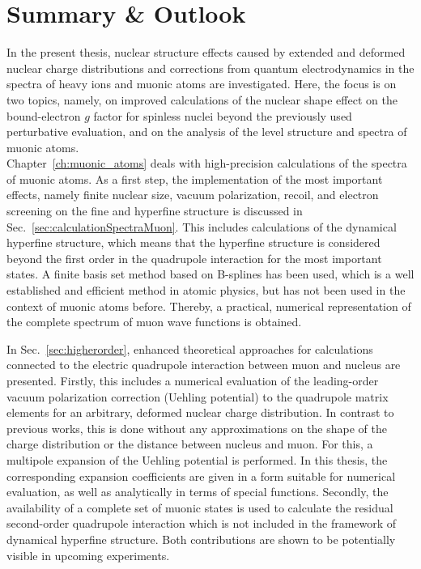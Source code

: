 \chapter*{Summary \& Outlook}
\label{ch:conclusion}

In the present thesis, nuclear structure effects caused by extended and deformed nuclear charge distributions and corrections from quantum electrodynamics in the spectra of heavy ions and muonic atoms are investigated. 
Here, the focus is on two topics, namely, on improved calculations of the nuclear shape effect on the bound-electron $g$ factor for spinless nuclei beyond the previously used perturbative evaluation, and on the analysis of the level structure and spectra of muonic atoms.\\[11pt]%
%
Chapter~\ref{ch:muonic_atoms} deals with high-precision calculations of the spectra of muonic atoms. 
As a first step, the implementation of the most important effects, namely finite nuclear size, vacuum polarization, recoil, and electron screening on the fine and hyperfine structure is discussed in Sec.~\ref{sec:calculationSpectraMuon}.
This includes calculations of the dynamical hyperfine structure, which means that the hyperfine structure is considered beyond the first order in the quadrupole interaction for the most important states.
A finite basis set method based on B-splines has been used, which is a well established and efficient method in atomic physics, but has not been used in the context of muonic atoms before. Thereby, a practical, numerical representation of the complete spectrum of muon wave functions is obtained.

In Sec.~\ref{sec:higherorder}, enhanced theoretical approaches for calculations connected to the electric quadrupole interaction between muon and nucleus are presented. 
Firstly, this includes a numerical evaluation of the leading-order vacuum polarization correction (Uehling potential) to the quadrupole matrix elements for an arbitrary, deformed nuclear charge distribution. In contrast to previous works, this is done without any approximations on the shape of the charge distribution or the distance between nucleus and muon. For this, a multipole expansion of the Uehling potential is performed. In this thesis, the corresponding expansion coefficients are given in a form suitable for numerical evaluation, as well as analytically in terms of special functions.
Secondly, the availability of a complete set of muonic states is used to calculate the residual second-order quadrupole interaction which is not included in the framework of dynamical hyperfine structure. 
Both contributions are shown to be potentially visible in upcoming experiments.

